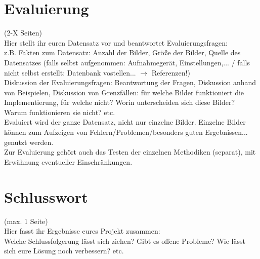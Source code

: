 \documentclass[paper=A4, deutsch]{scrartcl}
\begin{document}
\section{Evaluierung}
(2-X Seiten)\\
Hier stellt ihr euren Datensatz vor und beantwortet Evaluierungsfragen:\\
z.B. Fakten zum Datensatz: Anzahl der Bilder, Größe der Bilder, Quelle des Datensatzes (falls selbst aufgenommen: Aufnahmegerät, Einstellungen,... / falls nicht selbst erstellt: Datenbank vostellen... $\to$ Referenzen!)\\
Diskussion der Evaluierungsfragen: Beantwortung der Fragen, Diskussion anhand von Beispielen, Diskussion von Grenzfällen: für welche Bilder funktioniert die Implementierung, für welche nicht? Worin unterscheiden sich diese Bilder? Warum funktionieren sie nicht? etc.\\
Evaluiert wird der ganze Datensatz, nicht nur einzelne Bilder. Einzelne Bilder können zum Aufzeigen von Fehlern/Problemen/besonders guten Ergebnissen... genutzt werden.\\
Zur Evaluierung gehört auch das Testen der einzelnen Methodiken (separat), mit Erwähnung eventueller Einschränkungen.

\section{Schlusswort}
(max. 1 Seite)\\
Hier fasst ihr Ergebnisse eures Projekt zusammen:\\
Welche Schlussfolgerung lässt sich ziehen? Gibt es offene Probleme? Wie lässt sich eure Lösung noch verbessern? etc.




\end{document}
